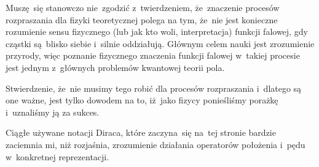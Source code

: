 \documentclass[a4paper,11pt]{article}
\begin{document}
\noindent
{} Muszę~się stanowczo nie~zgodzić z~twierdzeniem, że~znaczenie
procesów rozpraszania dla fizyki teoretycznej polega na tym, że~nie jest
konieczne rozumienie sensu fizycznego (lub jak kto woli, interpretacja)
funkcji falowej, gdy cząstki są~blisko siebie i~silnie oddziałują. Głównym
celem nauki jest zrozumienie przyrody, więc poznanie fizycznego znaczenia
funkcji falowej w~takiej procesie jest jednym z~głównych problemów
kwantowej teorii pola.

Stwierdzenie, że~nie musimy tego robić dla procesów rozpraszania
i~dlatego są one ważne, jest tylko dowodem na to, iż~jako fizycy
ponieśliśmy porażkę i~uznaliśmy ją za sukces.

\vspace{\spaceFour}




\noindent
{}

\vspace{\spaceFour}





\noindent
{} Ciągłe używane notacji Diraca, które zaczyna~się
na~tej stronie bardzie zaciemnia mi, niż rozjaśnia, zrozumienie
działania operatorów położenia i~pędu w~konkretnej reprezentacji.

\vspace{\spaceFour}





\noindent
{}

\vspace{\spaceFour}





\newpage

\end{document}
